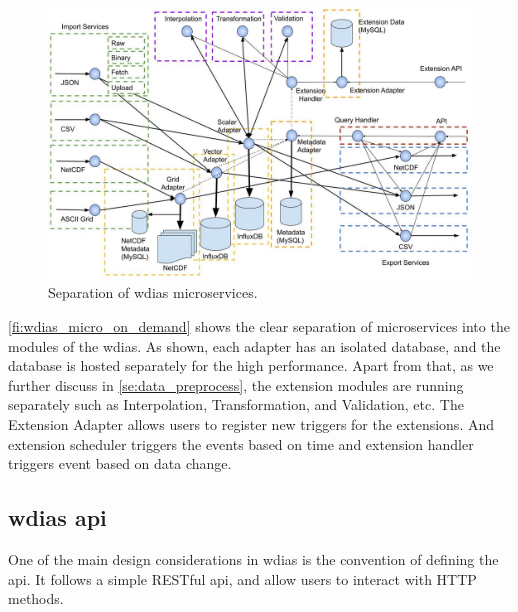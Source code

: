 \begin{figure}[htp]
    \centering
    \includegraphics[width=1\textwidth]{method/microservice/separation_microservices-v3.jpg}
    \caption{Separation of \acrshort{wdias} microservices.}
    \label{fi:wdias_micro_separation}
\end{figure}
\cref{fi:wdias_micro_on_demand} shows the clear separation of microservices into the modules of the \acrshort{wdias}. As shown, each adapter has an isolated database, and the database is hosted separately for the high performance. 
Apart from that, as we further discuss in \cref{se:data_preprocess}, the extension modules are running separately such as Interpolation, Transformation, and Validation, etc. 
The Extension Adapter allows users to register new triggers for the extensions. And extension scheduler triggers the events based on time and extension handler triggers event based on data change.


\subsection{\acrshort{wdias} \acrfull{api}}
\label{sebse:wdias_api}
One of the main design considerations in \acrshort{wdias} is the convention of defining the \acrshort{api}. It follows a simple RESTful \acrshort{api}, and allow users to interact with HTTP methods.

